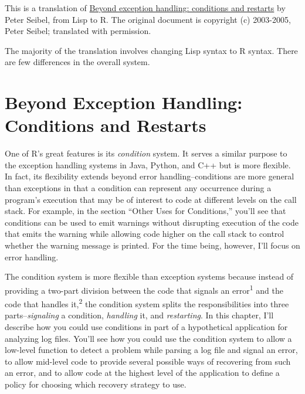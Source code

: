 This is a translation of
\href{http://www.gigamonkeys.com/book/beyond-exception-handling-conditions-and-restarts.html}{Beyond
exception handling: conditions and restarts} by Peter Seibel, from Lisp
to R. The original document is copyright (c) 2003-2005, Peter Seibel;
translated with permission.

The majority of the translation involves changing Lisp syntax to R
syntax. There are few differences in the overall system.

\hypertarget{beyond-exception-handling-conditions-and-restarts}{%
\chapter{Beyond Exception Handling: Conditions and
Restarts}\label{beyond-exception-handling-conditions-and-restarts}}

One of R's great features is its \emph{condition} system. It serves a
similar purpose to the exception handling systems in Java, Python, and
C++ but is more flexible. In fact, its flexibility extends beyond error
handling--conditions are more general than exceptions in that a
condition can represent any occurrence during a program's execution that
may be of interest to code at different levels on the call stack. For
example, in the section ``Other Uses for Conditions,'' you'll see that
conditions can be used to emit warnings without disrupting execution of
the code that emits the warning while allowing code higher on the call
stack to control whether the warning message is printed. For the time
being, however, I'll focus on error handling.

The condition system is more flexible than exception systems because
instead of providing a two-part division between the code that signals
an error\textsuperscript{1} and the code that handles
it,\textsuperscript{2} the condition system splits the responsibilities
into three parts--\emph{signaling} a condition, \emph{handling} it, and
\emph{restarting}. In this chapter, I'll describe how you could use
conditions in part of a hypothetical application for analyzing log
files. You'll see how you could use the condition system to allow a
low-level function to detect a problem while parsing a log file and
signal an error, to allow mid-level code to provide several possible
ways of recovering from such an error, and to allow code at the highest
level of the application to define a policy for choosing which recovery
strategy to use.

